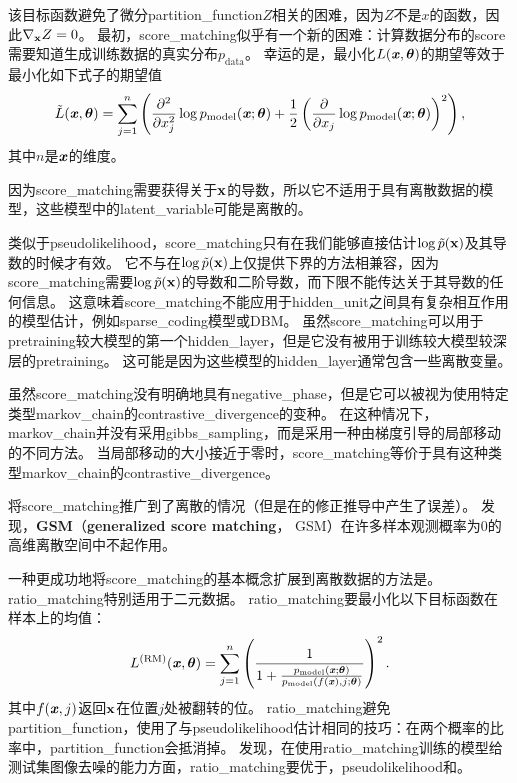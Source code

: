 该目标函数避免了微分\gls{partition_function}$Z$相关的困难，因为$Z$不是$x$的函数，因此$\nabla_{\mathbf{x}} Z = 0$。
最初，\gls{score_matching}似乎有一个新的困难：计算数据分布的\gls{score}需要知道生成训练数据的真实分布$p_{\text{data}}$。
幸运的是，最小化$L(\boldsymbol{\mathit{x}}, \boldsymbol{\theta})$的期望等效于最小化如下式子的期望值
\begin{equation}
	\tilde{L} (\boldsymbol{\mathit{x}}, \boldsymbol{\theta}) = \sum_{j=1}^n \left( \frac{\partial^2}{ \partial x_j^2 } 
	\log p_{\text{model}} (\boldsymbol{\mathit{x}}; \boldsymbol{\theta}) + \frac{1}{2} \left( \frac{\partial}{ \partial x_j }
	\log p_{\text{model}} (\boldsymbol{\mathit{x}}; \boldsymbol{\theta})
  \right)^2
\right),
\end{equation}
其中$n$是$\boldsymbol{\mathit{x}}$的维度。


因为\gls{score_matching}需要获得关于$\mathbf{x}$的导数，所以它不适用于具有离散数据的模型，这些模型中的\gls{latent_variable}可能是离散的。


类似于\gls{pseudolikelihood}，\gls{score_matching}只有在我们能够直接估计$\log \tilde{p}(\mathbf{x})$及其导数的时候才有效。
它不与在$\log \tilde{p}(\mathbf{x})$上仅提供下界的方法相兼容，因为\gls{score_matching}需要$\log \tilde{p}(\mathbf{x})$的导数和二阶导数，而下限不能传达关于其导数的任何信息。
这意味着\gls{score_matching}不能应用于\gls{hidden_unit}之间具有复杂相互作用的模型估计，例如\gls{sparse_coding}模型或\gls{DBM}。
虽然\gls{score_matching}可以用于\gls{pretraining}较大模型的第一个\gls{hidden_layer}，但是它没有被用于训练较大模型较深层的\gls{pretraining}。
这可能是因为这些模型的\gls{hidden_layer}通常包含一些离散变量。


虽然\gls{score_matching}没有明确地具有\gls{negative_phase}，但是它可以被视为使用特定类型\gls{markov_chain}的\gls{contrastive_divergence}的变种\citep{Hyvarinen-2007b}。
在这种情况下，\gls{markov_chain}并没有采用\gls{gibbs_sampling}，而是采用一种由梯度引导的局部移动的不同方法。
当局部移动的大小接近于零时，\gls{score_matching}等价于具有这种类型\gls{markov_chain}的\gls{contrastive_divergence}。


\cite{Lyu09}将\gls{score_matching}推广到了离散的情况（但是在\cite{Marlin10Inductive-small}的修正推导中产生了误差）。
\cite{Marlin10Inductive-small}发现，\textbf{\gls{GSM}}（\textbf{generalized score matching}， GSM）在许多样本观测概率为$0$的高维离散空间中不起作用。


一种更成功地将\gls{score_matching}的基本概念扩展到离散数据的方法是\citep{Hyvarinen-2007}。
\gls{ratio_matching}特别适用于二元数据。
\gls{ratio_matching}要最小化以下目标函数在样本上的均值：
\begin{equation}
	L^{(\text{RM})} (\boldsymbol{\mathit{x}}, \boldsymbol{\theta}) = \sum_{j=1}^n \left( 
	\frac{1}{ 1 + \frac{ p_{\text{model}}(\boldsymbol{\mathit{x}}; \boldsymbol{\theta}) }{ p_{\text{model}}(f(\boldsymbol{\mathit{x}}), j; \boldsymbol{\theta}) } } 
\right)^2.
\end{equation}
其中$f(\boldsymbol{\mathit{x}}, j)$返回$\mathbf{x}$在位置$j$处被翻转的位。
\gls{ratio_matching}避免\gls{partition_function}，使用了与\gls{pseudolikelihood}估计相同的技巧：在两个概率的比率中，\gls{partition_function}会抵消掉。
\cite{Marlin10Inductive-small}发现，在使用\gls{ratio_matching}训练的模型给测试集图像去噪的能力方面，\gls{ratio_matching}要优于，\gls{pseudolikelihood}和。

